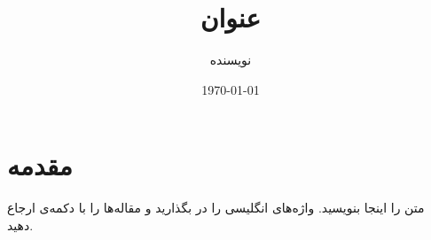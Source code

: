 \documentclass[11pt]{article}
\title{عنوان}
\author{نویسنده}
\date{\today}
\begin{document}
\maketitle

\section{مقدمه}
متن را اینجا بنویسید. واژه‌های انگلیسی را در  بگذارید و مقاله‌ها را با دکمه‌ی  ارجاع دهید.



\end{document}
